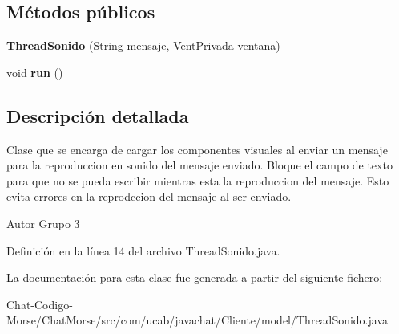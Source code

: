 \subsection*{Métodos públicos}
\begin{DoxyCompactItemize}
\item 
\hypertarget{classcom_1_1ucab_1_1javachat_1_1_cliente_1_1model_1_1_thread_sonido_a0ec275d6fb6a9fd01e4fadd9d4fc37fb}{{\bfseries Thread\-Sonido} (String mensaje, \hyperlink{classcom_1_1ucab_1_1javachat_1_1_cliente_1_1view_1_1_vent_privada}{Vent\-Privada} ventana)}\label{classcom_1_1ucab_1_1javachat_1_1_cliente_1_1model_1_1_thread_sonido_a0ec275d6fb6a9fd01e4fadd9d4fc37fb}

\item 
\hypertarget{classcom_1_1ucab_1_1javachat_1_1_cliente_1_1model_1_1_thread_sonido_a24fb07725315930b0378c9e18360d293}{void {\bfseries run} ()}\label{classcom_1_1ucab_1_1javachat_1_1_cliente_1_1model_1_1_thread_sonido_a24fb07725315930b0378c9e18360d293}

\end{DoxyCompactItemize}


\subsection{Descripción detallada}
Clase que se encarga de cargar los componentes visuales al enviar un mensaje para la reproduccion en sonido del mensaje enviado. Bloque el campo de texto para que no se pueda escribir mientras esta la reproduccion del mensaje. Esto evita errores en la reprodccion del mensaje al ser enviado. \begin{DoxyAuthor}{Autor}
Grupo 3 
\end{DoxyAuthor}


Definición en la línea 14 del archivo Thread\-Sonido.\-java.



La documentación para esta clase fue generada a partir del siguiente fichero\-:\begin{DoxyCompactItemize}
\item 
Chat-\/\-Codigo-\/\-Morse/\-Chat\-Morse/src/com/ucab/javachat/\-Cliente/model/Thread\-Sonido.\-java\end{DoxyCompactItemize}
